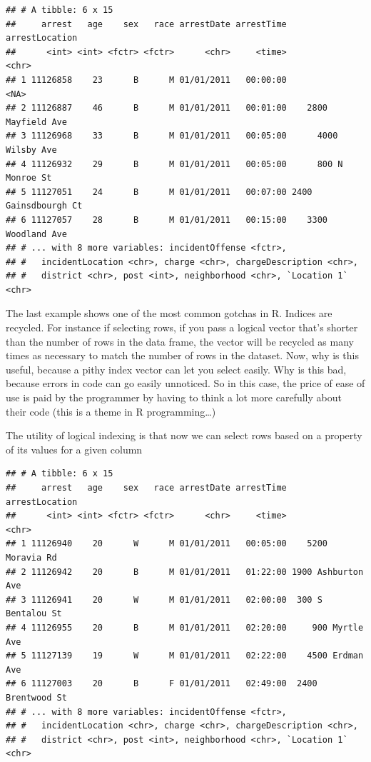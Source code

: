 \documentclass[12pt,]{book}
\newenvironment{Shaded}{\begin{snugshade}}{\end{snugshade}}
\newcommand{\KeywordTok}[1]{\textcolor[rgb]{0.13,0.29,0.53}{\textbf{#1}}}
\newcommand{\DecValTok}[1]{\textcolor[rgb]{0.00,0.00,0.81}{#1}}
\newcommand{\StringTok}[1]{\textcolor[rgb]{0.31,0.60,0.02}{#1}}
\newcommand{\CommentTok}[1]{\textcolor[rgb]{0.56,0.35,0.01}{\textit{#1}}}
\newcommand{\OperatorTok}[1]{\textcolor[rgb]{0.81,0.36,0.00}{\textbf{#1}}}
\newcommand{\NormalTok}[1]{#1}
\theoremstyle{definition}
\theoremstyle{definition}
\theoremstyle{remark}
\begin{document}
\begin{verbatim}
## # A tibble: 6 x 15
##     arrest   age    sex   race arrestDate arrestTime       arrestLocation
##      <int> <int> <fctr> <fctr>      <chr>     <time>                <chr>
## 1 11126858    23      B      M 01/01/2011   00:00:00                 <NA>
## 2 11126887    46      B      M 01/01/2011   00:01:00    2800 Mayfield Ave
## 3 11126968    33      B      M 01/01/2011   00:05:00      4000 Wilsby Ave
## 4 11126932    29      B      M 01/01/2011   00:05:00      800 N Monroe St
## 5 11127051    24      B      M 01/01/2011   00:07:00 2400 Gainsdbourgh Ct
## 6 11127057    28      B      M 01/01/2011   00:15:00    3300 Woodland Ave
## # ... with 8 more variables: incidentOffense <fctr>,
## #   incidentLocation <chr>, charge <chr>, chargeDescription <chr>,
## #   district <chr>, post <int>, neighborhood <chr>, `Location 1` <chr>
\end{verbatim}

The last example shows one of the most common gotchas in R. Indices are
recycled. For instance if selecting rows, if you pass a logical vector
that's shorter than the number of rows in the data frame, the vector
will be recycled as many times as necessary to match the number of rows
in the dataset. Now, why is this useful, because a pithy index vector
can let you select easily. Why is this bad, because errors in code can
go easily unnoticed. So in this case, the price of ease of use is paid
by the programmer by having to think a lot more carefully about their
code (this is a theme in R programming\ldots{})

The utility of logical indexing is that now we can select rows based on
a property of its values for a given column

\begin{Shaded}
\end{Shaded}

\begin{verbatim}
## # A tibble: 6 x 15
##     arrest   age    sex   race arrestDate arrestTime     arrestLocation
##      <int> <int> <fctr> <fctr>      <chr>     <time>              <chr>
## 1 11126940    20      W      M 01/01/2011   00:05:00    5200 Moravia Rd
## 2 11126942    20      B      M 01/01/2011   01:22:00 1900 Ashburton Ave
## 3 11126941    20      W      M 01/01/2011   02:00:00  300 S Bentalou St
## 4 11126955    20      B      M 01/01/2011   02:20:00     900 Myrtle Ave
## 5 11127139    19      W      M 01/01/2011   02:22:00    4500 Erdman Ave
## 6 11127003    20      B      F 01/01/2011   02:49:00  2400 Brentwood St
## # ... with 8 more variables: incidentOffense <fctr>,
## #   incidentLocation <chr>, charge <chr>, chargeDescription <chr>,
## #   district <chr>, post <int>, neighborhood <chr>, `Location 1` <chr>
\end{verbatim}
\end{document}
